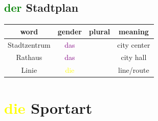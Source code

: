 \subsection{\textcolor{green}{der} Stadtplan}
\begin{center}
    \begin{tabular}{|c|c|c|c|}
        \hline
        \rowcolor{gray}
        word         & gender                  & plural & meaning     \\
        \hline
        Stadtzentrum & \textcolor{purple}{das} &        & city center \\
        Rathaus      & \textcolor{purple}{das} &        & city hall   \\
        Linie        & \textcolor{yellow}{die} &        & line/route  \\
        \hline
    \end{tabular}
\end{center}

\section{\textcolor{yellow}{die} Sportart}

